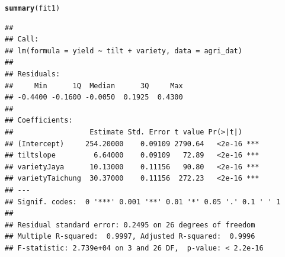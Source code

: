 \documentclass[11pt, a4paper]{article}\usepackage[]{graphicx}\usepackage[dvipsnames]{xcolor}
\makeatletter
\newcommand{\hlstd}[1]{\textcolor[rgb]{0.345,0.345,0.345}{#1}}%
\newcommand{\hlkwd}[1]{\textcolor[rgb]{0.737,0.353,0.396}{\textbf{#1}}}%
\newenvironment{kframe}{%
 \def\at@end@of@kframe{}%
 \ifinner\ifhmode%
  \def\at@end@of@kframe{\end{minipage}}%
  \begin{minipage}{\columnwidth}%
 \fi\fi%
 \def\FrameCommand##1{\hskip\@totalleftmargin \hskip-\fboxsep
 \colorbox{shadecolor}{##1}\hskip-\fboxsep
     \hskip-\linewidth \hskip-\@totalleftmargin \hskip\columnwidth}%
 \MakeFramed {\advance\hsize-\width
   \@totalleftmargin\z@ \linewidth\hsize
   \@setminipage}}%
 {\par\unskip\endMakeFramed%
 \at@end@of@kframe}
\newenvironment{knitrout}{}{} %
\makeatother
\begin{document}
\begin{knitrout}
\color{fgcolor}\begin{kframe}
\begin{alltt}
\hlkwd{summary}\hlstd{(fit1)}
\end{alltt}
\begin{verbatim}
## 
## Call:
## lm(formula = yield ~ tilt + variety, data = agri_dat)
## 
## Residuals:
##     Min      1Q  Median      3Q     Max 
## -0.4400 -0.1600 -0.0050  0.1925  0.4300 
## 
## Coefficients:
##                  Estimate Std. Error t value Pr(>|t|)    
## (Intercept)     254.20000    0.09109 2790.64   <2e-16 ***
## tiltslope         6.64000    0.09109   72.89   <2e-16 ***
## varietyJaya      10.13000    0.11156   90.80   <2e-16 ***
## varietyTaichung  30.37000    0.11156  272.23   <2e-16 ***
## ---
## Signif. codes:  0 '***' 0.001 '**' 0.01 '*' 0.05 '.' 0.1 ' ' 1
## 
## Residual standard error: 0.2495 on 26 degrees of freedom
## Multiple R-squared:  0.9997,	Adjusted R-squared:  0.9996 
## F-statistic: 2.739e+04 on 3 and 26 DF,  p-value: < 2.2e-16
\end{verbatim}
\end{kframe}
\end{knitrout}
\end{document}
